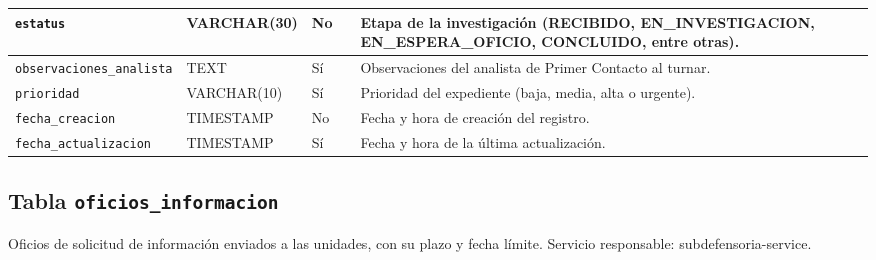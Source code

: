 \begin{longtable}{|L{3.9cm}|L{2.4cm}|L{0.9cm}|L{1.2cm}|L{6.6cm}|}
		\texttt{estatus} & VARCHAR(30) & No &  & Etapa de la investigación (RECIBIDO, EN\_INVESTIGACION, EN\_ESPERA\_OFICIO, CONCLUIDO, entre otras). \\ \hline
		\texttt{observaciones\_\allowbreak{}analista} & TEXT & Sí &  & Observaciones del analista de Primer Contacto al turnar. \\ \hline
		\texttt{prioridad} & VARCHAR(10) & Sí &  & Prioridad del expediente (baja, media, alta o urgente). \\ \hline
		\texttt{fecha\_\allowbreak{}creacion} & TIMESTAMP & No &  & Fecha y hora de creación del registro. \\ \hline
		\texttt{fecha\_\allowbreak{}actualizacion} & TIMESTAMP & Sí &  & Fecha y hora de la última actualización. \\ \hline
\end{longtable}
\normalsize
\setlength{\tabcolsep}{6pt}
\renewcommand{\arraystretch}{1}

\subsection{Tabla \texttt{oficios\_informacion}}
Oficios de solicitud de información enviados a las unidades, con su plazo y fecha límite. Servicio responsable: subdefensoria-service.


